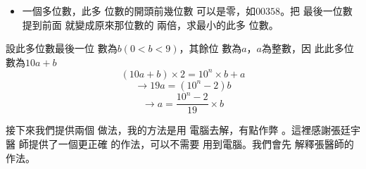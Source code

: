 \documentclass{article}
\begin{document}
%

\begin{itemize}
\item 一個多位數，此多%
位數的開頭前幾位數%
可以是零，如$00358$。把%
最後一位數提到前面%
就變成原來那位數的%
兩倍，求最小的此多%
位數。
\end{itemize}

\bigskip

\bigskip

設此多位數最後一位%
數為$b\left( 0<b<9\right) $，其餘位%
數為$a$，$a$為整數，因%
此此多位數為$10a+b$%
\[
\left( 10a+b\right) \times 2=10^{n}\times b+a 
\]%
\[
\rightarrow 19a=\left( 10^{n}-2\right) b 
\]%
\[
\rightarrow a=\frac{10^{n}-2}{19}\times b 
\]

接下來我們提供兩個%
做法，我的方法是用%
電腦去解，有點作弊%
。這裡感謝張廷宇醫%
師提供了一個更正確%
的作法，可以不需要%
用到電腦。我們會先%
解釋張醫師的作法。
\end{document}
